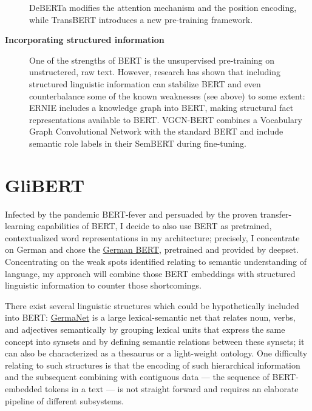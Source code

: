 \begin{description}
  DeBERTa \cite{he2020deberta} modifies the attention mechanism and the position encoding, while TransBERT \cite{li2021transbert} introduces a new pre-training framework.
  \item[\textbf{Incorporating structured information}] One of the strengths of BERT is the unsupervised pre-training on unstructered, raw text. However, research has shown that including structured linguistic information can stabilize BERT and even counterbalance some of the known weaknesses (see above) to some extent:
  ERNIE \cite{sun2019ernie} includes a knowledge graph into BERT, making structural fact representations available to BERT.
  VGCN-BERT \cite{lu2020vgcn} combines a Vocabulary Graph Convolutional Network with the standard BERT and \cite{zhang2019semantics} include semantic role labels in their SemBERT during fine-tuning.
\end{description}


\section{GliBERT}

Infected by the pandemic BERT-fever and persuaded by the proven transfer-learning
capabilities of BERT, I decide to also use BERT as pretrained, contextualized word
representations in my architecture; precisely, I concentrate on German and chose
the \href{https://deepset.ai/german-bert}{German BERT}, pretrained and provided
by deepset. Concentrating on the weak spots identified relating to semantic
understanding of language, my approach will combine those BERT embeddings with
structured linguistic information to counter those shortcomings.

There exist several linguistic structures which could be hypothetically included into BERT:
\href{https://uni-tuebingen.de/en/faculties/faculty-of-humanities/departments/modern-languages/department-of-linguistics/chairs/general-and-computational-linguistics/ressources/lexica/germanet/}{GermaNet}
\citep{hamp1997germanet} is a large lexical-semantic net that relates noun, verbs, and
adjectives semantically by grouping lexical units that express the same concept into synsets
and by defining semantic relations between these synsets; it can also be characterized as a
thesaurus or a light-weight ontology. One difficulty relating to such structures is
that the encoding of such hierarchical information and the subsequent combining with
contiguous data --- the sequence of BERT-embedded tokens in a text --- is not straight forward
and requires an elaborate pipeline of different subsystems.

